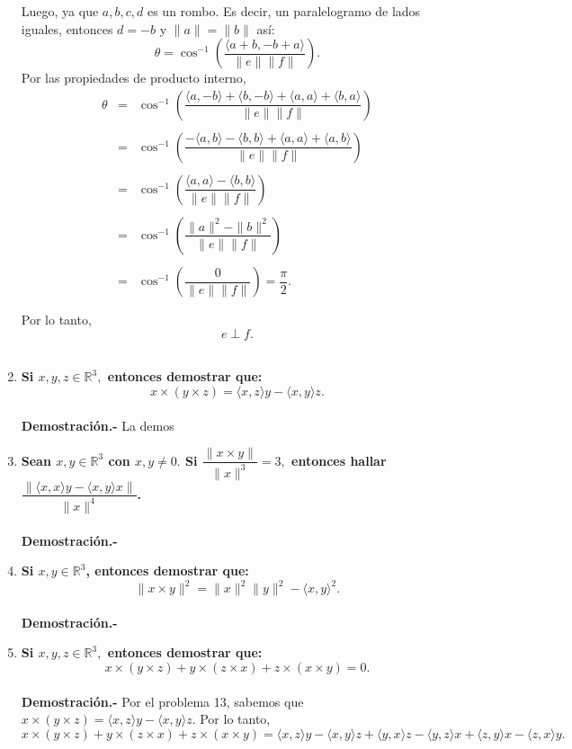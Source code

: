 \begin{enumerate}
	Luego, ya que $a,b,c,d$ es un rombo. Es decir, un paralelogramo de lados iguales, entonces $d=-b$ y $\|a\|=\|b\|$ así:
	$$\theta = \cos^{-1}\left(\dfrac{\langle a+b, -b+a\rangle}{\|e\|\|f\|}\right).$$
	Por las propiedades de producto interno,
	$$\begin{array}{rcl}
	    \theta&=&\cos^{-1}\left(\dfrac{\langle a,-b\rangle+\langle b,-b\rangle+\langle a,a\rangle+\langle b,a\rangle}{\|e\|\|f\|}\right)\\\\
		  &=&\cos^{-1}\left(\dfrac{-\langle a,b\rangle-\langle b,b\rangle+\langle a,a\rangle+\langle a,b\rangle}{\|e\|\|f\|}\right)\\\\
		  &=&\cos^{-1}\left(\dfrac{\langle a,a\rangle-\langle b,b\rangle}{\|e\|\|f\|}\right)\\\\
		  &=&\cos^{-1}\left(\dfrac{\|a\|^2-\|b\|^2}{\|e\|\|f\|}\right)\\\\
		  &=& \cos^{-1}\left(\dfrac{0}{\|e\|\|f\|}\right) = \dfrac{\pi}{2}.\\\\
	\end{array}$$
	Por lo tanto,
	$$e\perp f.$$\\


    \item \textbf{\boldmath Si $x,y,z \in \mathbb{R}^3,$ entonces demostrar que:
	$$x\times (y \times z) = \langle x,z\rangle y - \langle x,y\rangle z.$$\\
	Demostración.-}\; La demos

    \item \textbf{\boldmath Sean $x,y\in \mathbb{R}^3$ con $x,y\neq 0.$ Si $\dfrac{\|x\times y\|}{\|x\|^3}=3,$ entonces hallar $\dfrac{\| \langle x,x\rangle y - \langle x,y\rangle x \|}{\|x\|^4}$.\\\\
	Demostración.-}\;

    \item \textbf{\boldmath Si $x,y\in \mathbb{R}^3$, entonces demostrar que:
    $$\|x\times y\|^2 = \|x\|^2 \|y\|^2 - \langle x,y \rangle^2.$$\\
	Demostración.-}\;

    \item \textbf{\boldmath Si $x,y,z \in \mathbb{R}^3,$ entonces demostrar que:
    $$x\times (y\times z) + y \times (z\times x)+z\times(x\times y)=0.$$\\
	Demostración.-}\; Por el problema 13, sabemos que $x\times (y \times z) = \langle x,z\rangle y - \langle x,y\rangle z$. Por lo tanto,
	$$x\times (y\times z) + y \times (z\times x)+z\times(x\times y) = \langle x,z\rangle y- \langle x,y\rangle z + \langle y,x\rangle z -\langle y,z \rangle x +\langle z,y\rangle x -\langle z,x\rangle y.$$


\end{enumerate}
